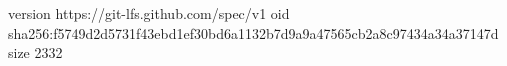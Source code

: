 version https://git-lfs.github.com/spec/v1
oid sha256:f5749d2d5731f43ebd1ef30bd6a1132b7d9a9a47565cb2a8c97434a34a37147d
size 2332
